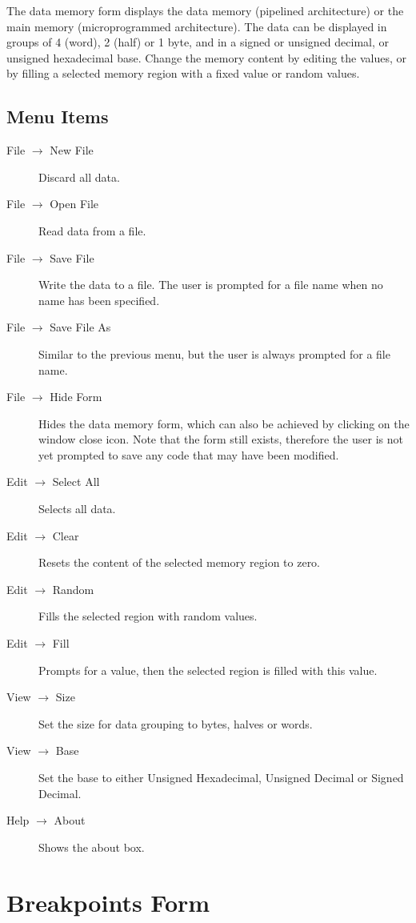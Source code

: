 \documentclass{article}
\begin{document}
The data memory form displays the data memory (pipelined architecture) 
or the main memory (microprogrammed architecture). The data can be 
displayed in groups of 4 (word), 2 (half) or 1 byte, and in a signed or 
unsigned decimal, or unsigned hexadecimal base. Change the memory 
content by editing the values, or by filling a selected memory region 
with a fixed value or random values.

\subsection{Menu Items}

\begin{description}
\item[File $\to$ New File] Discard all data.
\item[File $\to$ Open File] Read data from a file. 
\item[File $\to$ Save File] Write the data to a file. The user is prompted for a file name when no name has been specified.
\item[File $\to$ Save File As] Similar to the previous menu, but the user is always prompted for a file name.
\item[File $\to$ Hide Form] Hides the data memory 
form, which can also be achieved by clicking on the window close icon. 
Note that the form still exists, therefore the user is not yet prompted 
to save any code that may have been modified.
\item[Edit $\to$ Select All] Selects all data.
\item[Edit $\to$ Clear] Resets the content of the selected memory region to zero.
\item[Edit $\to$ Random]Fills the selected region with random values.
\item[Edit $\to$ Fill] Prompts for a value, then the selected region is filled with this value.
\item[View $\to$ Size] Set the size for data grouping to bytes, halves or words.
\item[View $\to$ Base] Set the base to either Unsigned Hexadecimal, Unsigned Decimal or Signed Decimal.
\item[Help $\to$ About] Shows the about box.
\end{description}

\section{Breakpoints Form}
\end{document}
